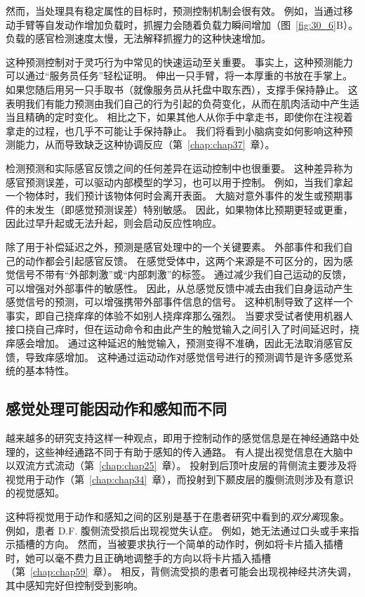 然而，当处理具有稳定属性的目标时，预测控制机制会很有效。
例如，当通过移动手臂等自发动作增加负载时，抓握力会随着负载力瞬间增加（图~\ref{fig:30_6}B）。
负载的感官检测速度太慢，无法解释抓握力的这种快速增加。


这种预测控制对于灵巧行为中常见的快速运动至关重要。
事实上，这种预测能力可以通过“服务员任务”轻松证明。 
伸出一只手臂，将一本厚重的书放在手掌上。
如果您随后用另一只手取书（就像服务员从托盘中取东西），支撑手保持静止。
这表明我们有能力预测由我们自己的行为引起的负荷变化，从而在肌肉活动中产生适当且精确的定时变化。
相比之下，如果其他人从你手中拿走书，即使你在注视着拿走的过程，也几乎不可能让手保持静止。
我们将看到小脑病变如何影响这种预测能力，从而导致缺乏这种协调反应（第~\ref{chap:chap37}~章）。


检测预测和实际感官反馈之间的任何差异在运动控制中也很重要。
这种差异称为感官预测误差，可以驱动内部模型的学习，也可以用于控制。
例如，当我们拿起一个物体时，我们预计该物体何时会离开表面。
大脑对意外事件的发生或预期事件的未发生（即感觉预测误差）特别敏感。
因此，如果物体比预期更轻或更重，因此过早升起或无法升起，则会启动反应性响应。


除了用于补偿延迟之外，预测是感官处理中的一个关键要素。
外部事件和我们自己的动作都会引起感官反馈。
在感觉受体中，这两个来源是不可区分的，因为感觉信号不带有“外部刺激”或“内部刺激”的标签。
通过减少我们自己运动的反馈，可以增强对外部事件的敏感性。
因此，从总感觉反馈中减去由我们自身运动产生感觉信号的预测，可以增强携带外部事件信息的信号。
这种机制导致了这样一个事实，即自己挠痒痒的体验不如别人挠痒痒那么强烈。
当要求受试者使用机器人接口挠自己痒时，但在运动命令和由此产生的触觉输入之间引入了时间延迟时，挠痒感会增加。
通过这种延迟的触觉输入，预测变得不准确，因此无法取消感官反馈，导致痒感增加。
这种通过运动动作对感觉信号进行的预测调节是许多感觉系统的基本特性。



\subsection{感觉处理可能因动作和感知而不同}

越来越多的研究支持这样一种观点，即用于控制动作的感觉信息是在神经通路中处理的，这些神经通路不同于有助于感知的传入通路。
有人提出视觉信息在大脑中以双流方式流动（第~\ref{chap:chap25}~章）。
投射到后顶叶皮层的背侧流主要涉及将视觉用于动作（第~\ref{chap:chap34}~章），而投射到下颞皮层的腹侧流则涉及有意识的视觉感知。


这种将视觉用于动作和感知之间的区别是基于在患者研究中看到的\textit{双分离}现象。
例如，患者 D.F. 腹侧流受损后出现视觉失认症。
例如，她无法通过口头或手来指示插槽的方向。
然而，当被要求执行一个简单的动作时，例如将卡片插入插槽时，她可以毫不费力且正确地调整手的方向以将卡片插入插槽（第~\ref{chap:chap59}~章）。
相反，背侧流受损的患者可能会出现视神经共济失调，其中感知完好但控制受到影响。


